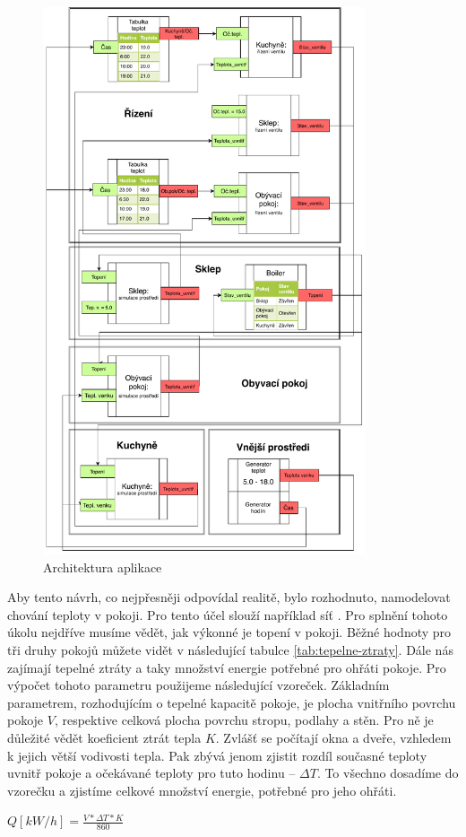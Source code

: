 \begin{figure}[htb]
 \centering
 \includegraphics[width=0.85\textwidth]{obrazky-figures/boiler-net.pdf}
 \caption{Architektura aplikace}
 \label{boiler-net}
\end{figure}

Aby tento návrh, co nejpřesněji odpovídal realitě, bylo rozhodnuto, namodelovat chování teploty v pokoji. Pro tento účel slouží například síť .
Pro splnění tohoto úkolu nejdříve musíme vědět, jak výkonné je topení v pokoji. Běžné hodnoty pro tři druhy pokojů můžete vidět v následující tabulce \ref{tab:tepelne-ztraty}. Dále nás zajímají tepelné ztráty a taky množství energie potřebné pro ohřáti pokoje. Pro výpočet tohoto parametru použijeme následující vzoreček. Základním parametrem, rozhodujícím o tepelné kapacitě pokoje, je plocha vnitřního povrchu pokoje $V$, respektive celková plocha povrchu stropu, podlahy a stěn. Pro ně je důležité vědět koeficient ztrát tepla $K$. Zvlášť se počítají okna a dveře, vzhledem k jejich větší vodivosti tepla. Pak zbývá jenom zjistit rozdíl současné teploty uvnitř pokoje a očekávané teploty pro tuto hodinu -- $\Delta{T}$. To všechno dosadíme do vzorečku a zjistíme celkové množství energie, potřebné pro jeho ohřáti. \cite{tep_calc}
\begin{center}
 $Q[kW/h] = \frac{V*\Delta{T}*K}{860}$
\end{center}

